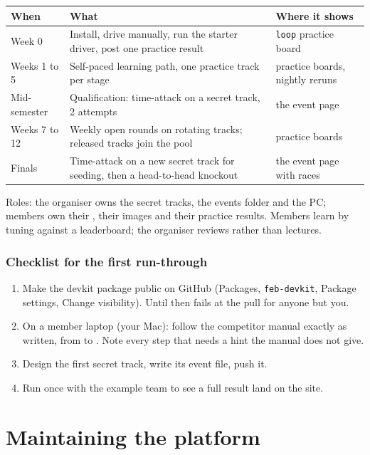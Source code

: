 \documentclass[11pt,a4paper]{article}
\begin{document}
\begin{tabularx}{\linewidth}{lXl}
\toprule
When & What & Where it shows\\
\midrule
Week 0 & Install, drive manually, run the starter driver, post one practice result & \texttt{loop} practice board\\
Weeks 1 to 5 & Self-paced learning path, one practice track per stage & practice boards, nightly reruns\\
Mid-semester & Qualification: time-attack on a secret track, 2 attempts & the event page\\
Weeks 7 to 12 & Weekly open rounds on rotating tracks; released tracks join the pool & practice boards\\
Finals & Time-attack on a new secret track for seeding, then a head-to-head knockout & the event page with races\\
\bottomrule
\end{tabularx}

\medskip
Roles: the organiser owns the secret tracks, the events folder and the PC; members own their
, their images and their practice results. Members learn by tuning against a
leaderboard; the organiser reviews rather than lectures.

\section{Checklist for the first run-through}

\begin{enumerate}
  \item Make the devkit package public on GitHub (Packages, \texttt{feb-devkit}, Package settings, Change visibility). Until then  fails at the pull for anyone but you.
  \item On a member laptop (your Mac): follow the competitor manual exactly as written, from  to . Note every step that needs a hint the manual does not give.
  \item Design the first secret track, write its event file, push it.
  \item Run  once with the example team to see a full result land on the site.
\end{enumerate}

\part{Maintaining the platform}
\end{document}
